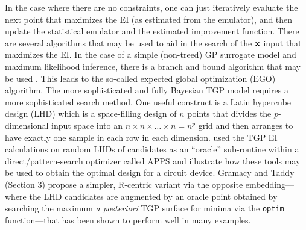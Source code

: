 \documentclass[12pt]{article}
\begin{document}
In the case where there are no constraints, one can just iteratively
evaluate the next point that maximizes the EI (as estimated from the
emulator), and then update the statistical emulator and the
estimated improvement function.  There are several 
algorithms that may be used to aid in the search of the $\bf x$ input
that maximizes the EI.  In the case of a simple (non-treed) GP
surrogate model and maximum likelihood inference, there is a branch
and bound algorithm that may be used
\cite{jones:schonlau:welch:1998}.  This leads to the so-called
expected global optimization (EGO) algorithm.  The more sophisticated
and fully Bayesian TGP model requires a more sophisticated search
method.  One useful construct is a Latin hypercube design (LHD)
\cite{mcka:cono:beck:1979} which is a space-filling design of
$n$ points that divides the $p$-dimensional input space into an $n
\times n \times \ldots \times n = n^p$ grid and then arranges to have
exactly one sample in each row in each dimension.
\cite{tadd:lee:gray:grif:2009} used the TGP EI calculations
on random LHDs of candidates as an ``oracle'' sub-routine
within a direct/pattern-search optimizer called APPS
\cite{gray:kold:2006,kold:2005} and illustrate how these tools may be
used to obtain the optimal design for a circuit device.
Gramacy and Taddy \cite{gramacy:taddy:2010} (Section 3) propose a simpler, {\sf
  R}-centric variant via the opposite embedding---where the LHD
candidates are augmented by an oracle point obtained by searching the
maximum {\em a posteriori} TGP surface for minima via the {\tt optim}
function---that has been shown to perform well in many examples.
\end{document}
